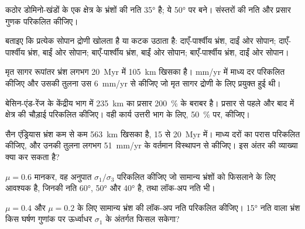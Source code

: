\begin{exercise}[$\star$]\label{exo:b3:extension-strike-slip:1}
कठोर डोमिनो-खंडों के एक क्षेत्र के भ्रंशों की नति \ang{35} है; ये
\ang{50} पर बने। संस्तरों की नति और प्रसार गुणक परिकलित कीजिए।
\end{exercise}

\begin{exercise}[$\star$]\label{exo:b3:extension-strike-slip:2}
बताइए कि प्रत्येक सोपान द्रोणी खोलता है या कटक उठाता है: दाएँ-पार्श्वीय भ्रंश, दाईं ओर
सोपान; दाएँ-पार्श्वीय भ्रंश, बाईं ओर सोपान; बाएँ-पार्श्वीय भ्रंश, बाईं ओर
सोपान; बाएँ-पार्श्वीय भ्रंश, दाईं ओर सोपान।
\end{exercise}

\begin{exercise}[$\star$]\label{exo:b3:extension-strike-slip:3}
मृत सागर रूपांतर भ्रंश लगभग \qty{20}{Myr} में \qty{105}{km} खिसका है।
\unit{mm/yr} में माध्य दर परिकलित कीजिए और उसकी तुलना उस \qty{6}{mm/yr} से कीजिए
जो मृत सागर द्रोणी के लिए प्रयुक्त हुई थी।
\end{exercise}

\begin{exercise}[$\star$]\label{exo:b3:extension-strike-slip:4}
बेसिन-एंड-रेंज के केंद्रीय भाग में \qty{235}{km} का प्रसार
\qty{200}{\percent} के बराबर है। प्रसार से पहले और बाद में क्षेत्र की चौड़ाई परिकलित कीजिए। वही
कार्य उत्तरी भाग के लिए, \qty{50}{\percent} पर, कीजिए।
\end{exercise}

\begin{exercise}[$\star\star$]\label{exo:b3:extension-strike-slip:5}
सैन एंड्रियास भ्रंश कम से कम \qty{563}{km} खिसका है, 15 से
\qty{20}{Myr} में। माध्य दरों का परास परिकलित कीजिए, और उनकी तुलना
लगभग \qty{51}{mm/yr} के वर्तमान विस्थापन से कीजिए। इस अंतर की व्याख्या क्या कर सकता है?
\end{exercise}

\begin{exercise}[$\star\star$]\label{exo:b3:extension-strike-slip:6}
$\mu = 0.6$ मानकर, वह अनुपात $\sigma_1/\sigma_3$ परिकलित कीजिए जो सामान्य भ्रंशों को
फिसलाने के लिए आवश्यक है, जिनकी नति \ang{60}, \ang{50} और \ang{40} है, तथा लॉक-अप नति भी।
\end{exercise}

\begin{exercise}[$\star\star$]\label{exo:b3:extension-strike-slip:7}
$\mu = 0.4$ और $\mu = 0.2$ के लिए सामान्य भ्रंश की लॉक-अप नति परिकलित कीजिए।
\ang{15} नति वाला भ्रंश किस घर्षण गुणांक पर
ऊर्ध्वाधर $\sigma_1$ के अंतर्गत फिसल सकेगा?
\end{exercise}

